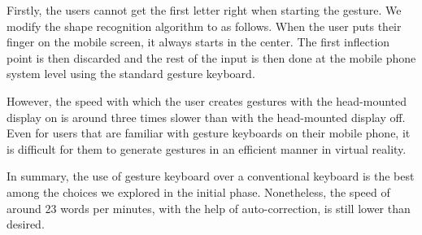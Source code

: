 Firstly, the users cannot get the first letter right when starting the gesture.  We modify the shape recognition algorithm to as follows.  When the user puts their finger on the mobile screen, it always starts in the center.
The first inflection point is then discarded and the rest of the input is then done at the mobile phone system level using the standard gesture keyboard.

However, the speed with which the user creates gestures with the head-mounted display on is around three times slower than with the head-mounted display off.
Even for users that are familiar with gesture keyboards on their mobile phone, it is difficult for them to generate gestures in an efficient manner in virtual reality.

In summary, the use of gesture keyboard over a conventional keyboard is the best among the choices we explored in the initial phase.
Nonetheless, the speed of around 23 words per minutes, with the help of auto-correction, is still lower than desired.


